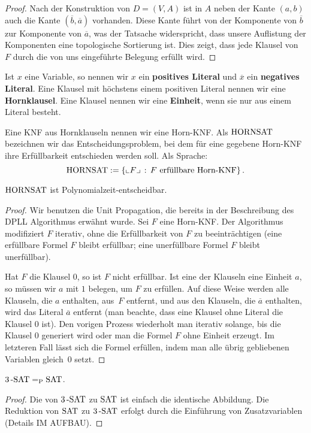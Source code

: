 \begin{proof}
	 Nach der Konstruktion von $D=(V,A)$ ist in $A$ neben der Kante $(a,b)$ auch die Kante $(\overline{b},\overline{a})$ vorhanden. Diese Kante führt von der Komponente von $\overline{b}$ zur Komponente von $\overline{a}$, was der Tatsache widerspricht, dass unsere Auflistung der  Komponenten eine topologische Sortierung ist. Dies zeigt, dass jede Klausel von~$F$ durch die von uns eingeführte Belegung erfüllt wird. 
\end{proof} 

\begin{defn}
	Ist $x$ eine Variable, so nennen wir $x$ ein \textbf{positives Literal} und $\overline{x}$ ein \textbf{negatives Literal}. Eine Klausel mit höchstens einem positiven Literal nennen wir eine \textbf{Hornklausel}. Eine Klausel nennen wir eine \textbf{Einheit}, wenn sie nur aus einem Literal besteht. 
	
	Eine KNF aus Hornklauseln nennen wir eine Horn-KNF. Als $\operatorname{HORNSAT}$ bezeichnen wir das Entscheidungsproblem, bei dem für eine gegebene Horn-KNF ihre Erfüllbarkeit entschieden werden soll. Als Sprache: 
	\[
		\operatorname{HORNSAT} := \left\{ {\llcorner F\lrcorner}  \,:\, F \text{ erfüllbare Horn-KNF} \right\}. 
	\]
\end{defn} 

\begin{thm}
	$\operatorname{HORNSAT}$ ist Polynomialzeit-entscheidbar. 
\end{thm} 
\begin{proof}
	Wir benutzen die Unit Propagation, die bereits in der Beschreibung des DPLL Algorithmus erwähnt wurde. Sei $F$ eine Horn-KNF. Der Algorithmus modifiziert $F$ iterativ, ohne die Erfüllbarkeit von $F$ zu beeinträchtigen (eine erfüllbare Formel $F$ bleibt erfüllbar; eine unerfüllbare Formel $F$ bleibt unerfüllbar). 

	Hat $F$ die Klausel $0$, so ist $F$ nicht erfüllbar.  Ist eine der Klauseln eine Einheit $a$, so müssen wir $a$ mit $1$ belegen, um $F$ zu erfüllen. Auf diese Weise werden alle Klauseln, die $a$ enthalten, aus~$F$ entfernt, und aus den Klauseln, die $\overline{a}$ enthalten, wird das Literal $\overline{a}$ entfernt (man beachte, dass eine Klausel ohne Literal die Klausel $0$ ist). Den vorigen Prozess wiederholt man iterativ  solange, bis die Klausel $0$ generiert wird oder man die Formel $F$ ohne Einheit erzeugt. Im letzteren Fall lässt sich die Formel erfüllen, indem man alle übrig gebliebenen Variablen gleich~$0$ setzt. 
\end{proof} 


\begin{thm}
	${3}\operatorname{-SAT} =_{\operatorname{P}}  \operatorname{SAT}$. 
\end{thm} 
\begin{proof}
	Die von  ${3}\operatorname{-SAT}$ zu $\operatorname{SAT}$ ist einfach die identische Abbildung. Die Reduktion von $\operatorname{SAT}$ zu ${3}\operatorname{-SAT}$ erfolgt durch die Einführung von Zusatzvariablen (Details IM AUFBAU). 
\end{proof} 
